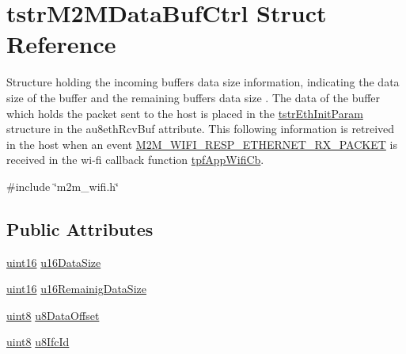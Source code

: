 \hypertarget{structtstrM2MDataBufCtrl}{}\section{tstr\+M2\+M\+Data\+Buf\+Ctrl Struct Reference}
\label{structtstrM2MDataBufCtrl}


Structure holding the incoming buffer\textquotesingle{}s data size information, indicating the data size of the buffer and the remaining buffer\textquotesingle{}s data size . The data of the buffer which holds the packet sent to the host is placed in the \hyperlink{structtstrEthInitParam}{tstr\+Eth\+Init\+Param} structure in the au8eth\+Rcv\+Buf attribute. This following information is retreived in the host when an event \hyperlink{group__WlanEnums_gga064de09dec1d5e88ed8d075fa40f57dea2d2336ccd8bfda6e083b0ec6b8d798ba}{M2\+M\+\_\+\+W\+I\+F\+I\+\_\+\+R\+E\+S\+P\+\_\+\+E\+T\+H\+E\+R\+N\+E\+T\+\_\+\+R\+X\+\_\+\+P\+A\+C\+K\+ET} is received in the wi-\/fi callback function \hyperlink{group__WlanEnums_gac5302f32839285fe8375c159087aa8a1}{tpf\+App\+Wifi\+Cb}.  




{\ttfamily \#include \char`\"{}m2m\+\_\+wifi.\+h\char`\"{}}

\subsection*{Public Attributes}
\begin{DoxyCompactItemize}
\item 
\hyperlink{group__DataT_ga1daa745171fc6e31d942c161422a76f9}{uint16} \hyperlink{group__WifiSetCustInfoElementFn_ga3f7624c769ee776c165695e62ddc0eff}{u16\+Data\+Size}
\item 
\hyperlink{group__DataT_ga1daa745171fc6e31d942c161422a76f9}{uint16} \hyperlink{group__WifiSetCustInfoElementFn_ga680ef685d03bc2cf57820c5721eefbd8}{u16\+Remainig\+Data\+Size}
\item 
\hyperlink{group__DataT_ga4df709a77647e870bbf1d955b8edc9a6}{uint8} \hyperlink{group__WifiSetCustInfoElementFn_ga64696606fffd6f5dc92e09f4906a820b}{u8\+Data\+Offset}
\item 
\hyperlink{group__DataT_ga4df709a77647e870bbf1d955b8edc9a6}{uint8} \hyperlink{group__WifiSetCustInfoElementFn_ga241fb3cd2305fec01b46ef9f19180806}{u8\+Ifc\+Id}
\end{DoxyCompactItemize}


